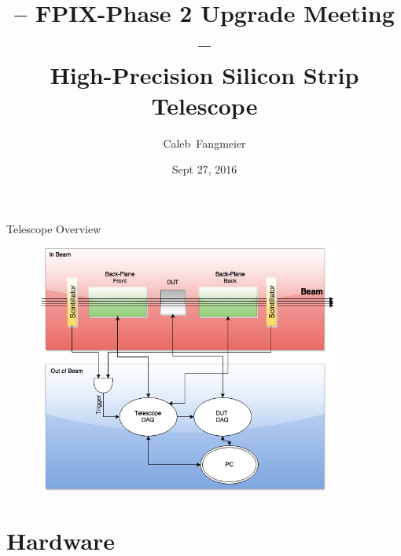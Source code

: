 \documentclass{beamer}
\title[\textbf{Silicon Telescope}]{-- FPIX-Phase 2 Upgrade Meeting -- \\ \textbf{High-Precision Silicon Strip Telescope}}
\author{Caleb~Fangmeier}
\institute[UNL]{University of Nebraska - Lincoln}
\date{Sept 27, 2016}
\begin{document}
\begin{frame}
  \titlepage
\end{frame}

\begin{frame}{Telescope Overview}
    \begin{figure}
    \centering
    \includegraphics[width=0.9\textwidth]{figures/Telescope_Hierarchy}
    \end{figure}
\end{frame}

\section{Hardware}
\end{document}
